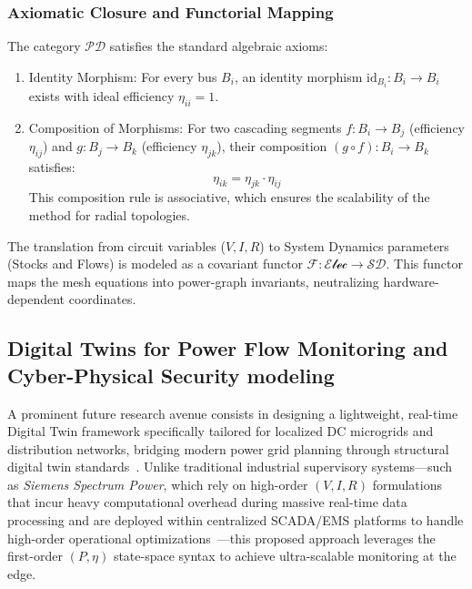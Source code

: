 \documentclass[11pt, a4paper]{article}
\begin{document}
\subsubsection{Axiomatic Closure and Functorial Mapping}
The category $\mathcal{PD}$ satisfies the standard algebraic axioms:
\begin{enumerate}
    \item {Identity Morphism:} For every bus $B_i$, an identity morphism $\mathrm{id}_{B_i}: B_i \to B_i$ exists with ideal efficiency $\eta_{ii} = 1$.
    \item {Composition of Morphisms:} For two cascading segments $f: B_i \to B_j$ (efficiency $\eta_{ij}$) and $g: B_j \to B_k$ (efficiency $\eta_{jk}$), their composition $(g \circ f): B_i \to B_k$ satisfies:
    \begin{equation}
        \eta_{ik} = \eta_{jk} \cdot \eta_{ij}
    \end{equation}
    This composition rule is associative, which ensures the scalability of the method for radial topologies.
\end{enumerate}

The translation from circuit variables ($V, I, R$) to System Dynamics parameters (Stocks and Flows) is modeled as a covariant functor $\mathscr{F}: \mathscr{Elec} \to \mathcal{SD}$. This functor maps the mesh equations into power-graph invariants, neutralizing hardware-dependent coordinates.



\subsection{Digital Twins for Power Flow Monitoring and Cyber-Physical Security modeling} \label{sec:future_digital_twins}

A prominent future research avenue consists in designing a lightweight, real-time Digital Twin framework specifically tailored for localized DC microgrids and distribution networks, bridging modern power grid planning through structural digital twin standards~\cite{en19020556}. Unlike traditional industrial supervisory systems—such as \textit{Siemens Spectrum Power}, which rely on high-order $(V, I, R)$ formulations that incur heavy computational overhead during massive real-time data processing and are deployed within centralized SCADA/EMS platforms to handle high-order operational optimizations~\cite{en18051020}—this proposed approach leverages the first-order $(P, \eta)$ state-space syntax to achieve ultra-scalable monitoring at the edge.
\end{document}

